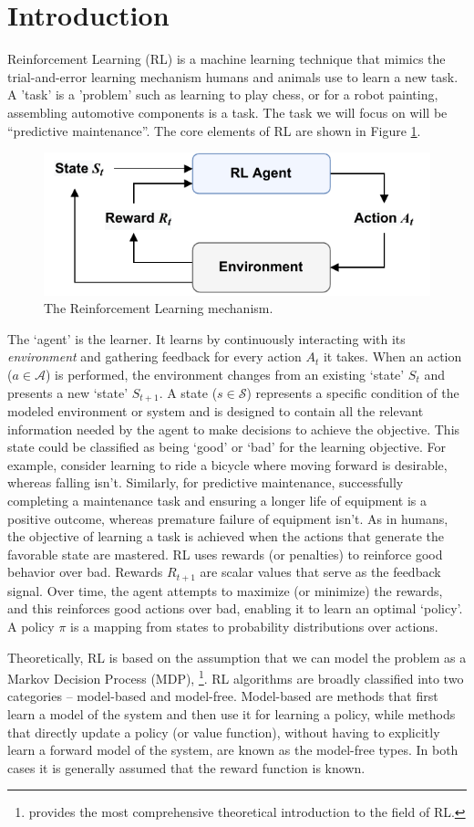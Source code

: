 \documentclass{article}
\begin{document}
\section{Introduction}
Reinforcement Learning (RL) is a machine learning technique that mimics the trial-and-error learning mechanism humans and animals use to learn a new task. A 'task' is a 'problem' such as learning to play chess, or for a robot painting, assembling automotive components is a task. The task we will focus on will be ``predictive maintenance''. The core elements of RL are shown in Figure \ref{fig:RL}.
\begin{figure}[h]
	\centering
	\includegraphics[width=0.5\linewidth]{images/RL-loop.pdf}
	\caption{The Reinforcement Learning mechanism.}
	\label{fig:RL}
\end{figure}

The `agent' is the learner. It learns by continuously interacting with its \textit{environment} and gathering feedback for every action $A_t$ it takes. When an action ($a\in \mathcal{A}$) is performed, the environment changes from an existing `state' $S_t$ and presents a new `state' $S_{t+1}$. A state ($s\in \mathcal{S}$) represents a specific condition of the modeled environment or system and is designed to contain all the relevant information needed by the agent to make decisions to achieve the objective. This state could be classified as being `good' or `bad' for the learning objective. For example, consider learning to ride a bicycle where moving forward is desirable, whereas falling isn't. Similarly, for predictive maintenance, successfully completing a maintenance task and ensuring a longer life of equipment is a positive outcome, whereas premature failure of equipment isn't. As in humans, the objective of learning a task is achieved when the actions that generate the favorable state are mastered. RL uses rewards (or penalties) to reinforce good behavior over bad. Rewards $R_{t+1}$ are scalar values that serve as the feedback signal. Over time, the agent attempts to maximize (or minimize) the rewards, and this reinforces good actions over bad, enabling it to learn an optimal `policy'. A policy $\pi$ is a mapping from states to probability distributions over actions.

Theoretically, RL is based on the assumption that we can model the problem as a Markov Decision Process (MDP), \citep{sutton2018}\footnote{\citet{sutton2018} provides the most comprehensive theoretical introduction to the field of RL.}. 
RL algorithms are broadly classified into two categories -- model-based and model-free. Model-based are methods that first learn a model of the system and then use it for learning a policy, while methods that directly update a policy (or value function), without having to explicitly learn a forward model of the system, are known as the model-free types. In both cases it is generally assumed that the reward function is known.
\end{document}
